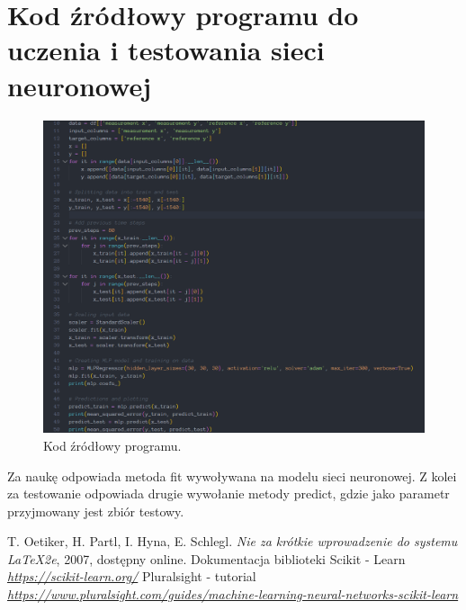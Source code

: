 \documentclass{classrep}
\begin{document}
\section{Kod źródłowy programu do uczenia i testowania sieci neuronowej}
{
	\begin{figure}[htp]
	\centering
	\includegraphics[width=15cm]{code.png}
	\caption{Kod źródłowy programu.}
	\label{fig:lion}
	\end{figure}
	Za naukę odpowiada metoda fit wywoływana na modelu sieci neuronowej. Z kolei za testowanie odpowiada drugie wywołanie metody predict, gdzie jako parametr przyjmowany jest zbiór testowy.
}

\begin{thebibliography}{0}
   T. Oetiker, H. Partl, I. Hyna, E. Schlegl.
    \textsl{Nie za krótkie wprowadzenie do systemu \LaTeX2e}, 2007, dostępny
    online.
 Dokumentacja biblioteki Scikit - Learn
	\textsl{\url{https://scikit-learn.org/}}
 Pluralsight - tutorial
	\textsl{ \url{https://www.pluralsight.com/guides/machine-learning-neural-networks-scikit-learn}}
\end{thebibliography}
\end{document}
